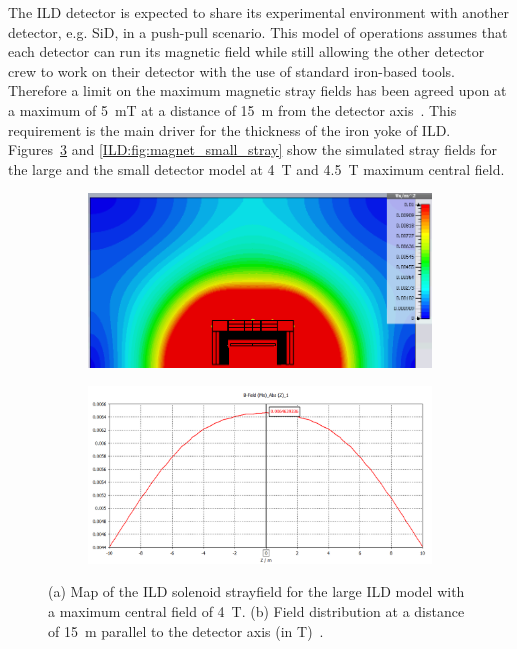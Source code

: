 The ILD detector is expected to share its experimental environment with another detector, e.g. SiD, in a push-pull scenario. This model of operations assumes that each detector can run its magnetic field while still allowing the other detector crew to work on their detector with the use of standard iron-based tools. Therefore a limit on the maximum magnetic stray fields has been agreed upon at a maximum of 5~mT at a distance of 15~m from the detector axis~\cite{Parker:2009zz}. This requirement is the main driver for the thickness of the iron yoke of ILD. Figures~\ref{ILD:fig:magnet_nominal_stray} and \ref{ILD:fig:magnet_small_stray} show the simulated stray fields for the large and the small detector model at 4~T and 4.5~T maximum central field.
\begin{figure}[t]
\begin{center}
\begin{subfigure}{0.75\hsize} \includegraphics[width=\textwidth]{Integration/fig/strayfield_nominal_4.png}
\caption{ \label{ild:fig:magnet_nominal_stray_map}}
 \end{subfigure}
\hspace{0.03\textwidth}
\begin{subfigure}{0.75\hsize} \includegraphics[width=\textwidth]{Integration/fig/strayfield_nominal_4_plot.png}
\caption{  \label{ild:fig:magnet_nominal_stray_field}}
 \end{subfigure}
\end{center}
\caption{(a) Map of the ILD solenoid strayfield for the large ILD model with a maximum central field of 4~T. (b) Field distribution at a distance of 15~m parallel to the detector axis (in T)~\cite{ild:bib:Magnet_Simulations}.}
\label{ILD:fig:magnet_nominal_stray}
\end{figure}

